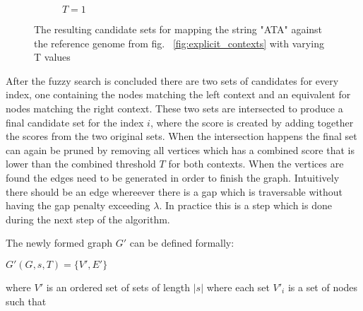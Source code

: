 \documentclass[thesis.tex]{subfiles}
\begin{document}
\begin{wrapfigure}{L}{0.5\textwidth}
\begin{subfigure}[t]{\textwidth}
\begin{mdframed}
    \end{mdframed}
    \caption{$T=1$}
  \end{subfigure}
  \caption{The resulting candidate sets for mapping the string "ATA" against the reference genome from fig. ~\ref{fig:explicit_contexts} with varying T values}
  \label{fig:candidate_nodes}
\end{wrapfigure}
After the fuzzy search is concluded there are two sets of candidates for every index, one containing the nodes matching the left context and an equivalent for nodes matching the right context. These two sets are intersected to produce a final candidate set for the index $i$, where the score is created by adding together the scores from the two original sets. When the intersection happens the final set can again be pruned by removing all vertices which has a combined score that is lower than the combined threshold $T$ for both contexts. When the vertices are found the edges need to be generated in order to finish the graph. Intuitively there should be an edge whereever there is a gap which is traversable without having the gap penalty exceeding $\lambda$. In practice this is a step which is done during the next step of the algorithm.\\
\par\noindent
The newly formed graph $G'$ can be defined formally:\\
\par
$G'(G, s, T) = \{V', E'\}$\\
\par\noindent
where $V'$ is an ordered set of sets of length $|s|$ where each set $V'_i$ is a set of nodes such that\\
\end{document}
